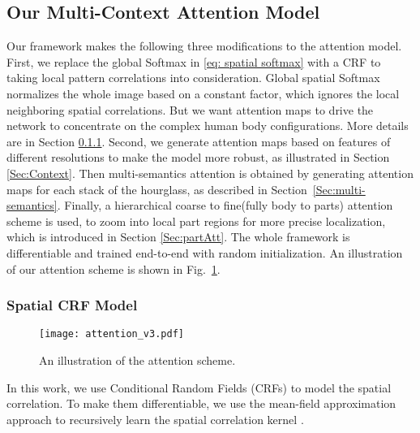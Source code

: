 \documentclass[10pt,twocolumn,letterpaper]{article}
\begin{document}
\subsection{Our Multi-Context Attention Model}
Our framework makes the following three modifications to the attention model. 
First, we replace the global Softmax in \ref{eq: spatial softmax} with a CRF to taking local pattern correlations into consideration.
Global spatial Softmax normalizes the whole image based on a constant factor, which ignores the local neighboring spatial correlations.
But we want attention maps to drive the network to concentrate on the complex human body configurations. 
More details are in Section \ref{Sec:Spatial}.
Second, we generate attention maps based on features of different resolutions to make the model more robust, as illustrated in Section \ref{Sec:Context}. 
Then multi-semantics attention is obtained by generating attention maps for each stack of the hourglass, as described in Section~\ref{Sec:multi-semantics}.
Finally, a hierarchical coarse to fine(\ie fully body to parts) attention scheme is used, to zoom into local part regions for more precise localization, which is introduced in Section \ref{Sec:partAtt}.
The whole framework is differentiable and trained end-to-end with random initialization. An illustration of our attention scheme is shown in Fig.~\ref{fig:attention generation}.
\vspace{-1em}
\subsubsection{Spatial CRF Model}
\label{Sec:Spatial}
\begin{figure}[t]
\begin{center}
   \texttt{[image: attention\_v3.pdf]}
\end{center}
	\vspace{-1.5em}
   \caption{\small An illustration of the attention scheme.}
   	\vspace{-1.5em}
\label{fig:attention generation}
\end{figure}

In this work, we use Conditional Random Fields (CRFs) to model the spatial correlation. 
To make them differentiable, we use the mean-field approximation approach to recursively learn the spatial correlation kernel \cite{zheng2015conditional,krahenbuhl2012efficient}. 
\end{document}
